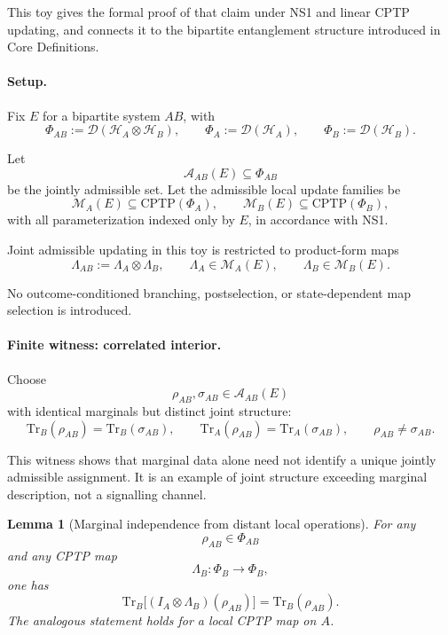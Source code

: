\documentclass[aps,prx,onecolumn,11pt]{revtex4-2}
\theoremstyle{plain}
\newtheorem{lemma}{Lemma}
\theoremstyle{definition}
\theoremstyle{remark}
\begin{document}
This toy gives the formal proof of that claim under NS1 and linear CPTP
updating, and connects it to the bipartite entanglement structure
introduced in Core Definitions.

\paragraph{Setup.}

Fix \(E\) for a bipartite system \(AB\), with
\[
\Phi_{AB}
:=
\mathcal D(\mathcal H_A\otimes\mathcal H_B),
\qquad
\Phi_A
:=
\mathcal D(\mathcal H_A),
\qquad
\Phi_B
:=
\mathcal D(\mathcal H_B).
\]

Let
\[
\mathcal A_{AB}(E)\subseteq\Phi_{AB}
\]
be the jointly admissible set. Let the admissible local update families
be
\[
\mathcal M_A(E)\subseteq \mathrm{CPTP}(\Phi_A),
\qquad
\mathcal M_B(E)\subseteq \mathrm{CPTP}(\Phi_B),
\]
with all parameterization indexed only by \(E\), in accordance with
NS1.

Joint admissible updating in this toy is restricted to product-form
maps
\[
\Lambda_{AB}
:=
\Lambda_A\otimes\Lambda_B,
\qquad
\Lambda_A\in\mathcal M_A(E),
\qquad
\Lambda_B\in\mathcal M_B(E).
\]

No outcome-conditioned branching, postselection, or state-dependent
map selection is introduced.

\paragraph{Finite witness: correlated interior.}

Choose
\[
\rho_{AB},\sigma_{AB}\in\mathcal A_{AB}(E)
\]
with identical marginals but distinct joint structure:
\[
\mathrm{Tr}_B(\rho_{AB})
=
\mathrm{Tr}_B(\sigma_{AB}),
\qquad
\mathrm{Tr}_A(\rho_{AB})
=
\mathrm{Tr}_A(\sigma_{AB}),
\qquad
\rho_{AB}\neq\sigma_{AB}.
\]

This witness shows that marginal data alone need not identify a unique
jointly admissible assignment. It is an example of joint structure
exceeding marginal description, not a signalling channel.

\begin{lemma}[Marginal independence from distant local operations]
\label{lem:marginal_invariance}
For any
\[
\rho_{AB}\in\Phi_{AB}
\]
and any CPTP map
\[
\Lambda_B:\Phi_B\to\Phi_B,
\]
one has
\[
\mathrm{Tr}_B\!\bigl[
(I_A\otimes\Lambda_B)(\rho_{AB})
\bigr]
=
\mathrm{Tr}_B(\rho_{AB}).
\]
The analogous statement holds for a local CPTP map on \(A\).
\end{lemma}
\end{document}
